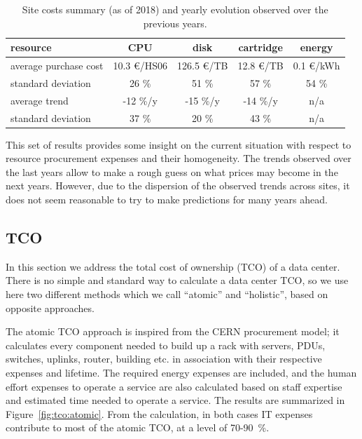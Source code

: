 \begin{table}[h]
    \centering
    \caption{Site costs summary (as of 2018) and yearly evolution observed over the previous years.}
    \label{tab:sitecosts}
    \begin{tabular}{lcccc}
        \hline
        resource & CPU & disk & cartridge & energy \\\hline
        average purchase cost & 10.3 \euro/HS06 & 126.5 \euro/TB & 12.8 \euro/TB & 0.1 \euro/kWh\\
        standard deviation & 26 \% & 51 \% & 57 \% & 54 \% \\
        average trend & -12 \%/y & -15 \%/y & -14 \%/y & n/a \\
        standard deviation & 37 \% & 20 \% & 43 \% & n/a \\\hline
    \end{tabular}
\end{table}


This set of results provides some insight on the current situation
with respect to resource procurement expenses and their
homogeneity. The trends observed over the last years allow to make a
rough guess on what prices may become in the next years. However, due
to the dispersion of the observed trends across sites, it does not seem
reasonable to try to make predictions for many years ahead.

\subsection{\label{sec:sitecost:tco}TCO}

In this section we address the total cost of ownership (TCO) of a data
center.  There is no simple and standard way to calculate a data
center TCO, so we use here two different methods which we call
``atomic'' and ``holistic'', based on opposite approaches.

The atomic TCO approach is inspired from the CERN procurement model;
it calculates every component needed to build up a rack with servers,
PDUs, switches, uplinks, router, building etc. in association with
their respective expenses and lifetime.  The required energy expenses
are included, and the human effort expenses to operate a service are
also calculated based on staff expertise and estimated time needed to
operate a service.  The results are summarized in
Figure~\ref{fig:tco:atomic}.  From the calculation, in both cases IT
expenses contribute to most of the atomic TCO, at a level of 70-90~\%.


